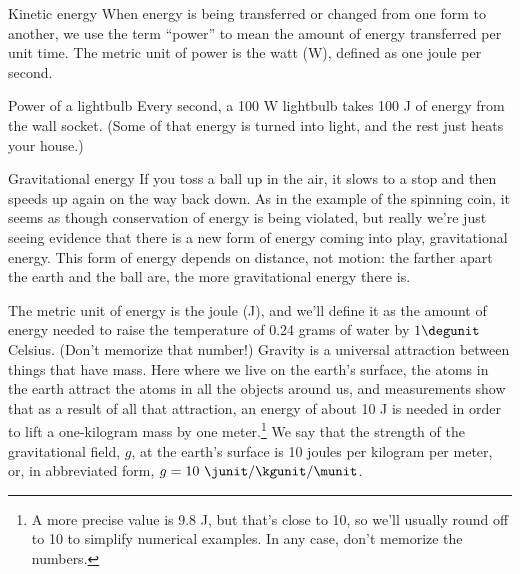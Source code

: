 \begin{envsubsection}{Kinetic energy}
When energy is being transferred or changed from one form to another, we use the term ``power''
to mean the amount of energy transferred per unit time. The metric unit of power is the watt (W),
defined as one joule per second.

\begin{eg}{Power of a lightbulb}
Every second, a 100 W lightbulb takes 100 J of energy from the wall socket. (Some of that energy
is turned into light, and the rest just heats your house.)
\end{eg}
\end{envsubsection}
%
\begin{envsubsection}{Gravitational energy}
If you toss a ball up in the air, it slows to a stop and then speeds up again on the way back down.
As in the example of the spinning coin, it seems as though conservation of energy is being violated,
but really we're just seeing evidence that there is a new form of energy coming into play,
gravitational energy. This form of energy depends on distance, not motion:
the farther apart the earth and the ball are, the more gravitational energy there is.


The metric unit of energy is the joule (J), and we'll define it as the amount of energy needed
to raise the temperature of 0.24 grams of water by $1\degunit$ Celsius. (Don't memorize that
number!)
Gravity is a universal attraction between things that have mass.
Here where we live on the earth's surface, the atoms in the earth attract the atoms in all the
objects around us, and measurements show that as a result of all that attraction, an energy of
about 10 J is needed in order to lift a one-kilogram mass by one meter.\footnote{A more precise value
is 9.8 J, but that's close to 10, so we'll usually round off to 10 to simplify numerical
examples. In any case, don't memorize the numbers.} We say that the strength of
the gravitational field, $g$, at the earth's surface is 10 joules per kilogram per meter, or,
in abbreviated form, $g=10\ \junit/\kgunit/\munit$.


\end{envsubsection}
